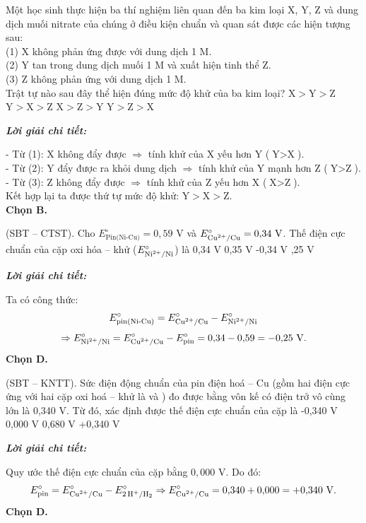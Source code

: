 \documentclass[11pt,a4paper]{article}
\def\loigiai#1{
\par\begingroup\color{blue!80!black}\small
\noindent\textbf{\textit{Lời giải chi tiết:}}\par
#1\par\endgroup}
\begin{document}
\begin{ex}
Một học sinh thực hiện ba thí nghiệm liên quan đến ba kim loại X, Y, Z và dung dịch muối nitrate của chúng ở điều kiện chuẩn và quan sát được các hiện tượng sau:\\
(1) X không phản ứng được với dung dịch  1 M.\\
(2) Y tan trong dung dịch muối  1 M và xuất hiện tinh thể Z.\\
(3) Z không phản ứng với dung dịch  1 M.\\
Trật tự nào sau đây thể hiện đúng mức độ khử của ba kim loại?
\choice
{$\text{X} > \text{Y} > \text{Z}$}
{\True $\text{Y} > \text{X} > \text{Z}$}
{$\text{X} > \text{Z} > \text{Y}$}
{$\text{Y} > \text{Z} > \text{X}$}
\loigiai{
- Từ (1): X không đẩy được  $\Rightarrow$ tính khử của X yếu hơn Y ($\text{Y} > \text{X}$).\\
- Từ (2): Y đẩy được \ce{Z+} ra khỏi dung dịch $\Rightarrow$ tính khử của Y mạnh hơn Z ($\text{Y} > \text{Z}$).\\
- Từ (3): Z không đẩy được \ce{X^2+} $\Rightarrow$ tính khử của Z yếu hơn X ($\text{X} > \text{Z}$).\\
Kết hợp lại ta được thứ tự mức độ khử: $\text{Y} > \text{X} > \text{Z}$.\\
\textbf{Chọn B.}}
\end{ex}

\begin{ex}
(SBT -- CTST). Cho $E^\circ_{\text{Pin(Ni-Cu)}} = 0{,}59\text{ V}$ và $E^\circ_{\ce{Cu^2+/Cu}} = 0{,}34\text{ V}$. Thế điện cực chuẩn của cặp oxi hóa -- khử  ($E^\circ_{\ce{Ni^2+/Ni}}$) là
\choice
{0,34 V}
{0,35 V}
{-0,34 V}
{,25 V}
\loigiai{
Ta có công thức:
$$E^\circ_{\text{pin(Ni-Cu)}} = E^\circ_{\ce{Cu^2+/Cu}} - E^\circ_{\ce{Ni^2+/Ni}}$$
$$\Rightarrow E^\circ_{\ce{Ni^2+/Ni}} = E^\circ_{\ce{Cu^2+/Cu}} - E^\circ_{\text{pin}} = 0{,}34 - 0{,}59 = -0{,}25\text{ V.}$$
\textbf{Chọn D.}}
\end{ex}

\begin{ex}
(SBT -- KNTT). Sức điện động chuẩn của pin điện hoá  -- Cu (gồm hai điện cực ứng với hai cặp oxi hoá -- khử là  và ) đo được bằng vôn kế có điện trở vô cùng lớn là 0,340 V. Từ đó, xác định được thế điện cực chuẩn của cặp  là
\choice
{-0,340 V}
{0,000 V}
{0,680 V}
{\True +0,340 V}
\loigiai{
Quy ước thế điện cực chuẩn của cặp  bằng $0{,}000\text{ V}$. Do đó:
$$E^\circ_{\text{pin}} = E^\circ_{\ce{Cu^2+/Cu}} - E^\circ_{\ce{2H+/H2}} \Rightarrow E^\circ_{\ce{Cu^2+/Cu}} = 0{,}340 + 0{,}000 = +0{,}340\text{ V.}$$
\textbf{Chọn D.}}
\end{ex}
\end{document}
